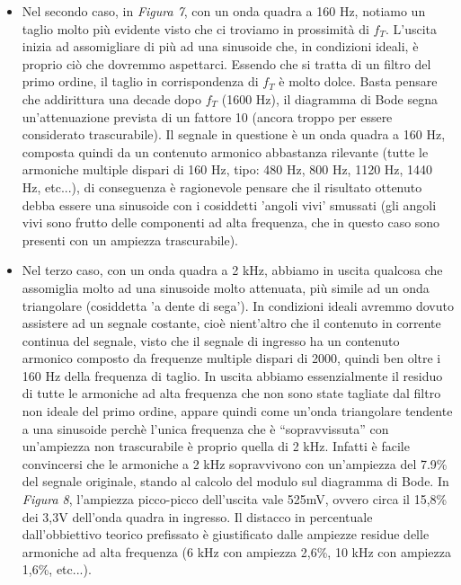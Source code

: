 \documentclass{article}
\begin{document}
\begin{itemize}
      \item Nel secondo caso, in \textit{Figura 7}, con un onda quadra a 160 Hz, notiamo un taglio molto più evidente visto che
            ci troviamo in prossimità di $f_{T}$. L’uscita inizia ad assomigliare di più ad una sinusoide che, in condizioni ideali,
            è proprio ciò che dovremmo aspettarci. Essendo che si tratta di un filtro del primo ordine, il taglio in corrispondenza
            di $f_{T}$ è molto dolce. Basta pensare che addirittura una decade dopo $f_{T}$ (1600 Hz), il diagramma di Bode segna
            un'attenuazione prevista di un fattore 10 (ancora troppo per essere considerato trascurabile). Il segnale in questione
            è un onda quadra a 160 Hz, composta quindi da un contenuto armonico abbastanza rilevante (tutte le armoniche multiple dispari di
            160 Hz, tipo: 480 Hz, 800 Hz, 1120 Hz, 1440 Hz, etc...), di conseguenza è ragionevole pensare che il risultato ottenuto debba
            essere una sinusoide con i cosiddetti 'angoli vivi' smussati (gli angoli vivi sono frutto delle componenti ad alta frequenza, 
            che in questo caso sono presenti con un ampiezza trascurabile).

      \item Nel terzo caso, con un onda quadra a 2 kHz, abbiamo in uscita qualcosa che assomiglia molto ad una sinusoide molto attenuata,
            più simile ad un onda triangolare (cosiddetta 'a dente di sega'). In condizioni ideali avremmo dovuto assistere ad un segnale costante,
            cioè nient'altro che il contenuto in corrente continua del segnale, visto che il segnale di ingresso ha un contenuto armonico composto da
            frequenze multiple dispari di 2000, quindi ben oltre i 160 Hz della frequenza di taglio. In uscita abbiamo essenzialmente il residuo di tutte
            le armoniche ad alta frequenza che non sono state tagliate dal filtro non ideale del primo ordine, appare quindi come un'onda triangolare
            tendente a una sinusoide perchè l’unica frequenza che è “sopravvissuta” con un’ampiezza non trascurabile è proprio quella di 2 kHz.
            Infatti è facile convincersi che le armoniche a 2 kHz sopravvivono con un'ampiezza del 7.9\% del segnale originale, stando al calcolo del modulo
            sul diagramma di Bode. In \textit{Figura 8}, l'ampiezza picco-picco dell'uscita vale 525mV, ovvero circa il 15,8\% dei 3,3V dell'onda quadra in ingresso.
            Il distacco in percentuale dall'obbiettivo teorico prefissato è giustificato dalle ampiezze residue delle armoniche ad alta frequenza
            (6 kHz con ampiezza 2,6\%, 10 kHz con ampiezza 1,6\%, etc...).
    \end{itemize}
\end{document}
